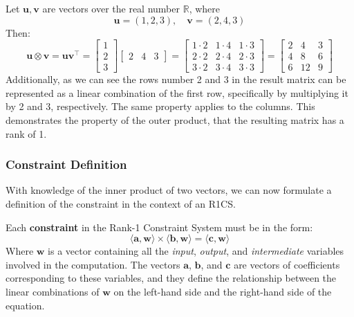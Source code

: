 \documentclass[../lecture-notes.tex]{subfiles}
\begin{document}
\begin{example}
    Let $\mathbf{u}, \mathbf{v}$ are vectors over the real number $\mathbb{R}$, where
    \begin{equation*}
        \mathbf{u} = (1, 2, 3), \quad \mathbf{v} = (2, 4, 3)
    \end{equation*}
    Then: 
    \begin{equation*}
        \mathbf{u} \otimes \mathbf{v} = \mathbf{u}\mathbf{v}^{\top} = \begin{bmatrix}
        1 \\ 2 \\ 3
        \end{bmatrix}\begin{bmatrix}
        2 & 4 & 3
        \end{bmatrix} = \begin{bmatrix}
            1 \cdot 2 & 1 \cdot 4 & 1 \cdot 3 \\
            2 \cdot 2 & 2 \cdot 4 & 2 \cdot 3 \\
            3 \cdot 2 & 3 \cdot 4 & 3 \cdot 3
        \end{bmatrix} = \begin{bmatrix}
            2 & 4 & 3 \\
            4 & 8 & 6 \\
            6 & 12 & 9
        \end{bmatrix}
    \end{equation*}
    Additionally, as we can see the rows number 2 and 3 in the result matrix can be represented
    as a linear combination of the first row, specifically by multiplying it by 2 and 3, 
    respectively. The same property applies to the columns. This demonstrates the property of the
    outer product, that the resulting matrix has a rank of 1.
\end{example}

\subsubsection{Constraint Definition}
With knowledge of the inner product of two vectors, we can now formulate a definition of the 
constraint in the context of an R1CS.

\begin{definition}
    Each \textbf{constraint} in the Rank-1 Constraint System must be in the form:
    \begin{equation*}
        \langle \mathbf{a}, \mathbf{w}\rangle \times \langle \mathbf{b}, \mathbf{w}\rangle = \langle \mathbf{c}, \mathbf{w}\rangle
    \end{equation*}
    Where $\mathbf{w}$ is a vector containing all the \textit{input}, \textit{output}, and 
    \textit{intermediate} variables involved in the computation. The vectors $\mathbf{a}$, 
    $\mathbf{b}$, and $\mathbf{c}$ are vectors of coefficients corresponding to these variables, 
    and they define the relationship between the linear combinations of $\mathbf{w}$ on the 
    left-hand side and the right-hand side of the equation.
\end{definition}
\end{document}
